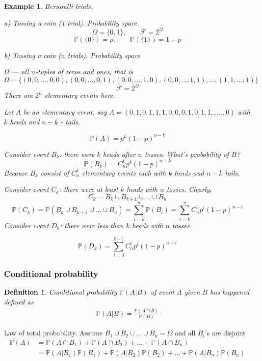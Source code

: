 \documentclass[10pt]{article}
\newtheorem*{definition}{Definition}
\newtheorem*{example}{Example}
\begin{document}
\begin{example} Bernoulli trials. 

a) Tossing a coin (1 trial). Probability space
$$
\Omega=\{0, 1\},\qquad \mathcal{F}=2^{\Omega}
$$
$$
\mathbb{P}(\{0\})=p,\qquad \mathbb{P}(\{1\})=1-p
$$

b) Tossing a coin ($n$ trials). Probability space

$\Omega$ --- all $n$-tuples of zeros and ones, that is
$$
\Omega=\{
(0,0,\ldots,0,0),
(0,0,\ldots,0,1),
(0,0,\ldots,1,0),
(0,0,\ldots,1,1),
\ldots,
(1,1,\ldots,1)
\}
$$
$$
\mathcal{F}=2^\Omega
$$
There are $2^n$ elementary events here.

Let $A$ be an elementary event, say $A=(0,1,0,1,1,1,0,0,0,1,0,1,1,,\ldots,0)$ with $k$ heads and $n-k$ - tails.

$$
\mathbb{P}(A)=p^k(1-p)^{n-k}
$$

Consider event $B_k$: there were $k$ heads after $n$ tosses. What's probability of $B$?
$$
\mathbb{P}(B_k)=C_n^kp^k(1-p)^{n-k}
$$
Because $B_k$ consist of $C_n^k$ elementary events each with $k$ heads and $n-k$ tails.

Consider event $C_k$: there were at least $k$ heads with $n$ tosses. Clearly,
$$
C_k=B_k\cup B_{k+1}\cup\ldots\cup B_n
$$
$$
\mathbb{P}(C_k)
=\mathbb{P}(B_k\cup B_{k+1}\cup\ldots\cup B_n)
=\sum_{i=k}^n \mathbb{P}(B_i)
=\sum_{i=k}^n C_n^ip^i(1-p)^{n-i}
$$
Consider event $D_k$: there were less than $k$ heads with $n$ tosses. 

$$
\mathbb{P}(D_k)=\sum_{i=0}^{k-1}C_n^ip^i(1-p)^{n-i}
$$

\end{example}

\subsubsection{Conditional probability}

\begin{definition} Conditional probability $\mathbb{P}(A|B)$ of event $A$ given $B$ has happened defined as
\begin{align}
\mathbb{P}(A|B)=\frac{\mathbb{P}(A\cap B)}{\mathbb{P}(B)}
\end{align}
\end{definition}

Law of total probability. Assume $B_1\cup B_2\cup\ldots\cup B_n=\Omega$ and all $B_i$'s are disjoint
\begin{align}
\mathbb{P}(A)
&=\mathbb{P}(A\cap B_1)+\mathbb{P}(A\cap B_2)+\ldots+\mathbb{P}(A\cap B_n)\\
&=\mathbb{P}(A| B_1)\mathbb{P}(B_1)+\mathbb{P}(A| B_2)\mathbb{P}(B_2)+\ldots+\mathbb{P}(A| B_n)\mathbb{P}(B_n)\\
\end{align}
\end{document}

